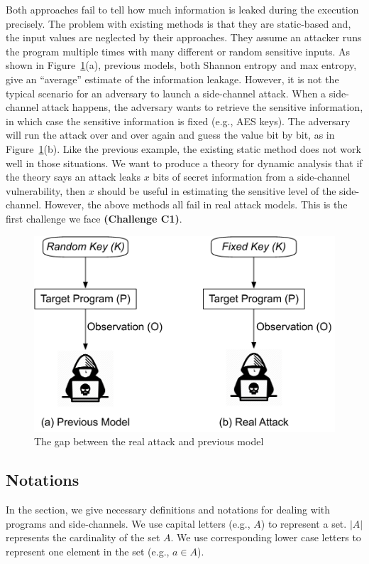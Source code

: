 Both approaches fail to tell how much information is leaked during the execution
precisely. The problem with existing methods is that they are static-based and,
the input values are neglected by their approaches. They assume an attacker runs
the program multiple times with many different or random sensitive inputs. As
shown in Figure~\ref{fig:gap}(a), previous models, both Shannon entropy and max
entropy, give an ``average'' estimate of the information leakage. However, it is
not the typical scenario for an adversary to launch a side-channel attack. When
a side-channel attack happens, the adversary wants to retrieve the sensitive
information, in which case the sensitive information is fixed (e.g., AES keys).
The adversary will run the attack over and over again and guess the value bit by
bit, as in Figure~\ref{fig:gap}(b). Like the previous example, the existing
static method does not work well in those situations. We want to produce a
theory for dynamic analysis that if the theory says an attack leaks $x$ bits of
secret information from a side-channel vulnerability, then $x$ should be useful
in estimating the sensitive level of the side-channel. However, the above
methods all fail in real attack models. This is the first challenge we face
\textbf{(Challenge C1)}.

\begin{figure}
    \centering
    \includegraphics[width=.8\columnwidth]{./figures/RA.pdf}
    \caption{The gap between the real attack and previous model}\label{fig:gap}
\end{figure}


\subsection{Notations}
In the section, we give necessary definitions and notations for dealing with
programs and side-channels. We use capital letters (e.g., $A$) to represent a
set. $|A|$ represents the cardinality of the set $A$. We use corresponding lower case
letters to represent one element in the set (e.g., $a \in A$).

